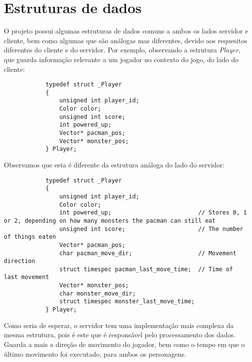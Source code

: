 \documentclass[a4paper]{report}
\begin{document}
    \section{Estruturas de dados}
        \par O projeto possui algumas estruturas de dados comuns a ambos os lados servidor e cliente, bem como algumas que são análogas mas diferentes, devido aos requesitos diferentes do cliente e do servidor. Por exemplo, observando a estrutura \textit{Player}, que guarda informação relevante a um jogador no contexto do jogo, do lado do cliente:
        \begin{lstlisting}
            typedef struct _Player
            {
                unsigned int player_id;
                Color color;
                unsigned int score;
                int powered_up;
                Vector* pacman_pos;
                Vector* monster_pos;
            } Player;
        \end{lstlisting}
        \par Observamos que esta é diferente da estrutura análoga do lado do servidor:
        \begin{lstlisting}
            typedef struct _Player
            {
                unsigned int player_id;
                Color color;
                int powered_up;                         // Stores 0, 1 or 2, depending on how many monsters the pacman can still eat
                unsigned int score;                     // The number of things eaten
                Vector* pacman_pos;
                char pacman_move_dir;                   // Movement direction
                struct timespec pacman_last_move_time;  // Time of last movement
                Vector* monster_pos;
                char monster_move_dir;
                struct timespec monster_last_move_time;
            } Player;
        \end{lstlisting}
        \par Como seria de esperar, o servidor tem uma implementação mais complexa da mesma estrutura, pois é este que é responsável pelo processamento dos dados. Guarda a mais a direção de movimento do jogador, bem como o tempo em que o último movimento foi executado, para ambos os personagens.
\end{document}
